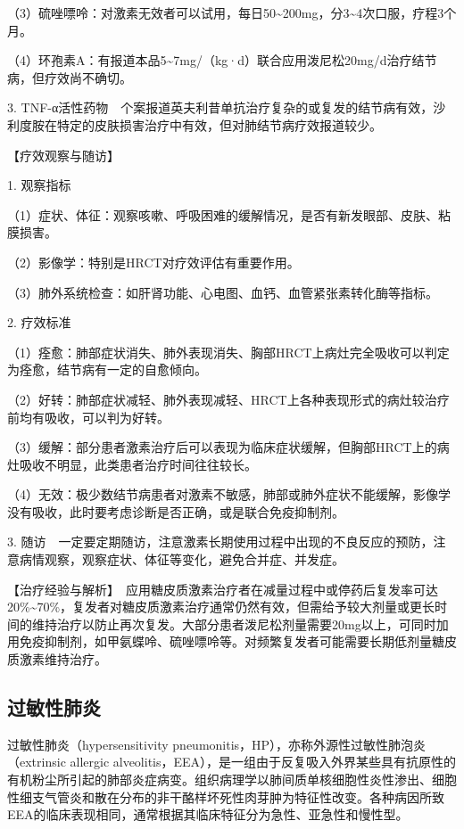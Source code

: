 （3）硫唑嘌呤：对激素无效者可以试用，每日50\textasciitilde{}200mg，分3\textasciitilde{}4次口服，疗程3个月。

（4）环孢素A：有报道本品5\textasciitilde{}7mg/（kg·d）联合应用泼尼松20mg/d治疗结节病，但疗效尚不确切。

3.
TNF-α活性药物　个案报道英夫利昔单抗治疗复杂的或复发的结节病有效，沙利度胺在特定的皮肤损害治疗中有效，但对肺结节病疗效报道较少。

【疗效观察与随访】

1. 观察指标

（1）症状、体征：观察咳嗽、呼吸困难的缓解情况，是否有新发眼部、皮肤、粘膜损害。

（2）影像学：特别是HRCT对疗效评估有重要作用。

（3）肺外系统检查：如肝肾功能、心电图、血钙、血管紧张素转化酶等指标。

2. 疗效标准

（1）痊愈：肺部症状消失、肺外表现消失、胸部HRCT上病灶完全吸收可以判定为痊愈，结节病有一定的自愈倾向。

（2）好转：肺部症状减轻、肺外表现减轻、HRCT上各种表现形式的病灶较治疗前均有吸收，可以判为好转。

（3）缓解：部分患者激素治疗后可以表现为临床症状缓解，但胸部HRCT上的病灶吸收不明显，此类患者治疗时间往往较长。

（4）无效：极少数结节病患者对激素不敏感，肺部或肺外症状不能缓解，影像学没有吸收，此时要考虑诊断是否正确，或是联合免疫抑制剂。

3.
随访　一定要定期随访，注意激素长期使用过程中出现的不良反应的预防，注意病情观察，观察症状、体征等变化，避免合并症、并发症。

【治疗经验与解析】　应用糖皮质激素治疗者在减量过程中或停药后复发率可达20\%\textasciitilde{}70\%，复发者对糖皮质激素治疗通常仍然有效，但需给予较大剂量或更长时间的维持治疗以防止再次复发。大部分患者泼尼松剂量需要20mg以上，可同时加用免疫抑制剂，如甲氨蝶呤、硫唑嘌呤等。对频繁复发者可能需要长期低剂量糖皮质激素维持治疗。

\subsection{过敏性肺炎}

过敏性肺炎（hypersensitivity
pneumonitis，HP），亦称外源性过敏性肺泡炎（extrinsic allergic
alveolitis，EEA），是一组由于反复吸入外界某些具有抗原性的有机粉尘所引起的肺部炎症病变。组织病理学以肺间质单核细胞性炎性渗出、细胞性细支气管炎和散在分布的非干酪样坏死性肉芽肿为特征性改变。各种病因所致EEA的临床表现相同，通常根据其临床特征分为急性、亚急性和慢性型。

